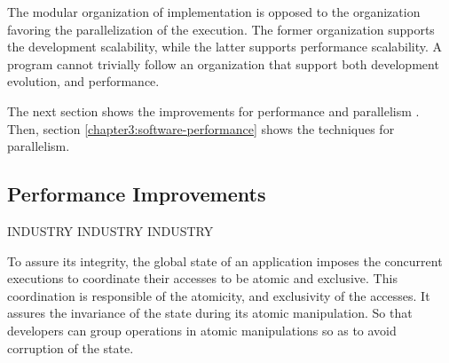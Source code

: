 








The modular organization of implementation is opposed to the organization favoring the parallelization of the execution.
The former organization supports the development scalability, while the latter supports performance scalability.
A program cannot trivially follow an organization that support both development evolution, and performance.

The next section shows the improvements for performance and parallelism .
Then, section \ref{chapter3:software-performance} shows the techniques for parallelism.

\subsection{Performance Improvements} \label{chapter3:software-maintainability:performance}

INDUSTRY INDUSTRY INDUSTRY

To assure its integrity, the global state of an application imposes the concurrent executions to coordinate their accesses to be atomic and exclusive.
This coordination is responsible of the atomicity, and exclusivity of the accesses.
It assures the invariance of the state during its atomic manipulation.
So that developers can group operations in atomic manipulations so as to avoid corruption of the state.

